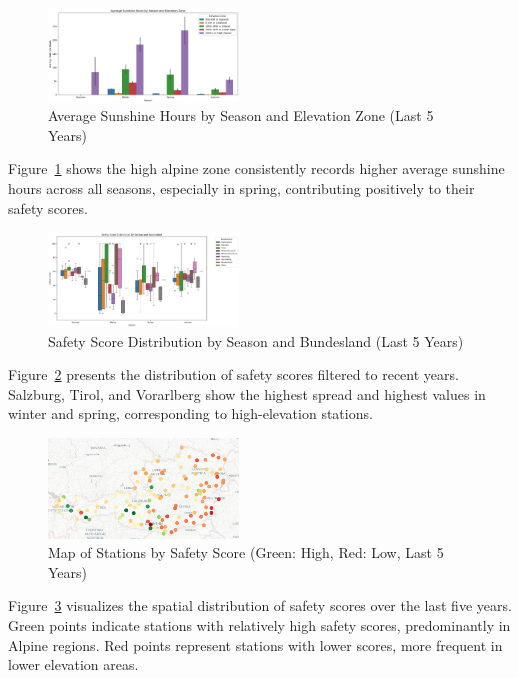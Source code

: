 \begin{figure}[H]
    \centering
    \includegraphics[width=0.45\textwidth]{img/sunshine_by_season_zone.png}
    \caption{Average Sunshine Hours by Season and Elevation Zone (Last 5 Years)}
    \label{fig:sunshine}
\end{figure}

Figure~\ref{fig:sunshine} shows the high alpine zone consistently records
higher average sunshine hours across all seasons, especially in spring,
contributing positively to their safety scores.

\begin{figure}[H]
    \centering
    \includegraphics[width=0.45\textwidth]{img/safety_score_boxplot.png}
    \caption{Safety Score Distribution by Season and Bundesland (Last 5 Years)}
    \label{fig:safety_boxplot}
\end{figure}

Figure~\ref{fig:safety_boxplot} presents the distribution of safety scores
filtered to recent years. Salzburg, Tirol, and Vorarlberg show the highest
spread and highest values in winter and spring, corresponding to high-elevation
stations.

\begin{figure}[H]
    \centering
    \includegraphics[width=0.45\textwidth]{img/station_map.png}
    \caption{Map of Stations by Safety Score (Green: High, Red: Low, Last 5 Years)}
    \label{fig:station_map}
\end{figure}

Figure~\ref{fig:station_map} visualizes the spatial distribution of safety
scores over the last five years. Green points indicate stations with relatively
high safety scores, predominantly in Alpine regions. Red points represent
stations with lower scores, more frequent in lower elevation areas.
